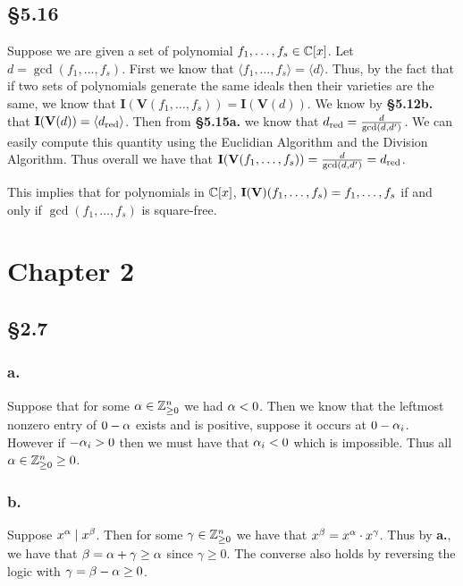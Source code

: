 \documentclass[letterpaper]{article}
\begin{document}
\subsection{\S 5.16}

Suppose we are given a set of polynomial $f_{1}, \ldots, f_{s} \in \mathbb{C}[x]$. Let $d = \gcd(f_{1}, \ldots, f_{s})$. First we know that $\langle f_{1}, \ldots, f_{s} \rangle = \langle d \rangle$. Thus, by the fact that if two sets of polynomials generate the same ideals then their varieties are the same, we know that $\textbf{I}(\textbf{V}(f_{1}, \ldots, f_{s})) = \textbf{I}(\textbf{V}(d))$. We know by \textbf{\S 5.12b.} that $\textbf{I}(\textbf{V}(d)) = \langle d_{\text{red}} \rangle$. Then from \textbf{\S 5.15a.} we know that $d_{\text{red}} = \frac{d}{\gcd(d, d')}$. We can easily compute this quantity using the Euclidian Algorithm and the Division Algorithm. Thus overall we have that $\textbf{I}(\textbf{V}(f_{1}, \ldots, f_{s})) = \gen{\frac{d}{\gcd(d, d')}} = \gen{d_{\red}}$.

This implies that for polynomials in $\mathbb{C}[x]$, $\textbf{I}\pqty{\textbf{V}}(f_{1}, \ldots, f_{s}) = \gen{f_{1}, \ldots, f_{s}}$ if and only if $\gcd(f_{1}, \ldots, f_{s})$ is square-free.

\clearpage

\section*{Chapter 2}

\subsection{\S 2.7}

\subsubsection{a.}

Suppose that for some $\alpha \in \mathbb{Z}_{\geq 0}^{n}$ we had $\alpha < 0$. Then we know that the leftmost nonzero entry of $0 - \alpha$ exists and is positive, suppose it occurs at $0 - \alpha_{i}$. However if $-\alpha_{i} > 0$ then we must have that $\alpha_{i} < 0$ which is impossible. Thus all $\alpha \in \mathbb{Z}_{\geq 0}^{n} \geq 0$.

\subsubsection{b.}

Suppose $x^{\alpha} \mid x^{\beta}$. Then for some $\gamma \in \mathbb{Z}_{\geq 0}^{n}$ we have that $x^{\beta} = x^{\alpha} \cdot x^{\gamma}$. Thus by \textbf{a.}, we have that $\beta = \alpha + \gamma \geq \alpha$ since $\gamma \geq 0$. The converse also holds by reversing the logic with $\gamma = \beta - \alpha \geq 0$.
\end{document}
